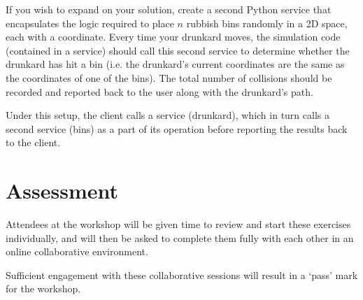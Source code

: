 \documentclass{article}
\begin{document}
If you wish to expand on your solution, create a second Python service that encapsulates the logic required to place $n$ rubbish bins randomly in a 2D space, each with a coordinate. 
Every time your drunkard moves, the simulation code (contained in a service) should call this second service to determine whether the drunkard has hit a bin (i.e. the drunkard's current coordinates are the same as the coordinates of one of the bins).
The total number of collisions should be recorded and reported back to the user along with the drunkard's path.

Under this setup, the client calls a service (drunkard), which in turn calls a second service (bins) as a part of its operation before reporting the results back to the client.

\section{Assessment}

Attendees at the workshop will be given time to review and start these exercises individually, and will then be asked to complete them fully with each other in an online collaborative environment.

Sufficient engagement with these collaborative sessions will result in a `pass' mark for the workshop.
\end{document}
